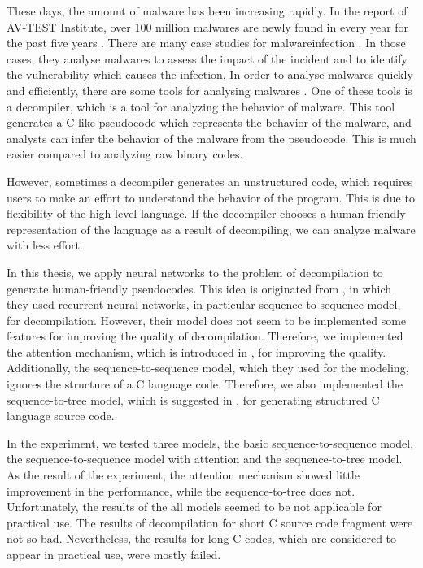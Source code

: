 \documentclass[senior,final,11pt]{iscs-thesis}
\begin{document}
These days, the amount of malware has been increasing rapidly. In the report of AV-TEST Institute,
over 100 million malwares are newly found in every year for the past five years \citep{malware_increase}.
There are many case studies for malwareinfection \citep{malware_case_1,malware_case_2,malware_case_3,malware_case_4}.
In those cases, they analyse malwares to assess the impact of the incident and to identify the vulnerability which causes the infection.
In order to analyse malwares quickly and efficiently, there are some tools for analysing malwares \citep{mal_anal_tool}.
One of these tools is a decompiler, which is a tool for analyzing the behavior of malware. 
This tool generates a C-like pseudocode which represents the behavior of the malware, and analysts can infer the behavior of the malware from the pseudocode.
This is much easier compared to analyzing raw binary codes.

However, sometimes a decompiler generates an unstructured code, which requires users to make an effort to understand the behavior of the program. 
This is due to flexibility of the high level language. If the decompiler chooses a human-friendly representation of the language as a result of decompiling, we can analyze malware with less effort. 

In this thesis, we apply neural networks to the problem of decompilation to generate human-friendly pseudocodes. 
This idea is originated from \citet{Motoneta}, in which they used recurrent neural networks, in particular sequence-to-sequence model, for decompilation.
However, their model does not seem to be implemented some features for improving the quality of decompilation.
Therefore, we implemented the attention mechanism, which is introduced in \citet{dot_attention}, for improving the quality.
Additionally, the sequence-to-sequence model, which they used for the modeling, ignores the structure of a C language code.
Therefore, we also implemented the sequence-to-tree model, which is suggested in \citet{Seq2Tree}, for generating structured C language source code.

In the experiment, we tested three models, the basic sequence-to-sequence model, the sequence-to-sequence model with attention and the sequence-to-tree model.
As the result of the experiment, the attention mechanism showed little improvement in the performance, while the sequence-to-tree does not.
Unfortunately, the results of the all models seemed to be not applicable for practical use.
The results of decompilation for short C source code fragment were not so bad. 
Nevertheless, the results for long C codes, which are considered to appear in practical use, were mostly failed.
\end{document}
